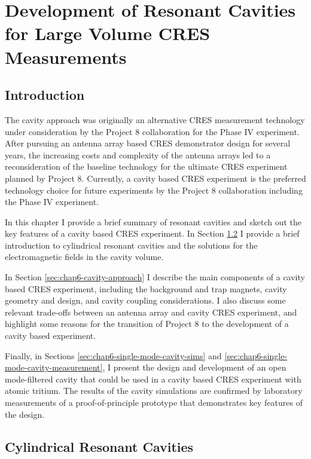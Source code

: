 
\chapter{Development of Resonant Cavities for Large Volume CRES Measurements}
\label{chap:cavity}

\section{Introduction}

The cavity approach was originally an alternative CRES measurement technology under consideration by the Project 8 collaboration for the Phase IV experiment. After pursuing an antenna array based CRES demonstrator design for several years, the increasing costs and complexity of the antenna arrays led to a reconsideration of the baseline technology for the ultimate CRES experiment planned by Project 8. Currently, a cavity based CRES experiment is the preferred technology choice for future experiments by the Project 8 collaboration including the Phase IV experiment.

In this chapter I provide a brief summary of resonant cavities and sketch out the key features of a cavity based CRES experiment. In Section \ref{sec:chap6-resonant-cavities} I provide a brief introduction to cylindrical resonant cavities and the solutions for the electromagnetic fields in the cavity volume.

In Section \ref{sec:chap6-cavity-approach} I describe the main components of a cavity based CRES experiment, including the background and trap magnets, cavity geometry and design, and cavity coupling considerations. I also discuss some relevant trade-offs between an antenna array and cavity CRES experiment, and highlight some reasons for the transition of Project 8 to the development of a cavity based experiment.

Finally, in Sections \ref{sec:chap6-single-mode-cavity-sims} and \ref{sec:chap6-single-mode-cavity-measurement}, I present the design and development of an open mode-filtered cavity that could be used in a cavity based CRES experiment with atomic tritium. The results of the cavity simulations are confirmed by laboratory measurements of a proof-of-principle prototype that demonstrates key features of the design.

\section{Cylindrical Resonant Cavities}
\label{sec:chap6-resonant-cavities}

